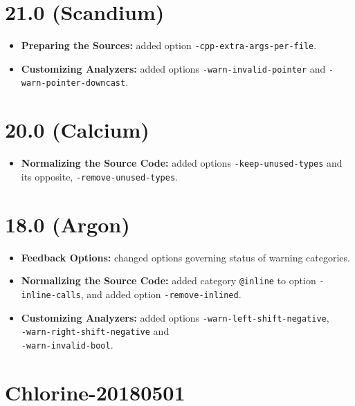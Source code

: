 \section*{21.0 (Scandium)}

\begin{itemize}
\item \textbf{Preparing the Sources:} added option
  \texttt{-cpp-extra-args-per-file}.
\item \textbf{Customizing Analyzers:} added options
  \texttt{-warn-invalid-pointer} and \texttt{-warn-pointer-downcast}.
\end{itemize}

\section*{20.0 (Calcium)}

\begin{itemize}
\item \textbf{Normalizing the Source Code:} added options
  \texttt{-keep-unused-types} and its opposite,
  \texttt{-remove-unused-types}.
\end{itemize}

\section*{18.0 (Argon)}

\begin{itemize}
\item \textbf{Feedback Options:} changed options governing status of warning categories.
\item \textbf{Normalizing the Source Code:} added category \texttt{@inline} to
option \texttt{-inline-calls}, and added option \texttt{-remove-inlined}.
\item \textbf{Customizing Analyzers:} added options
  \texttt{-warn-left-shift-negative}, \\
  \texttt{-warn-right-shift-negative} and \\
  \texttt{-warn-invalid-bool}.
\end{itemize}

\section*{Chlorine-20180501}

